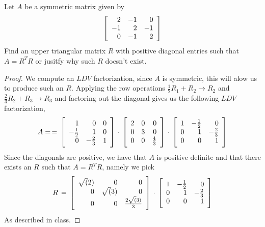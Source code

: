\newpage 
\question 
Let $A$ be a symmetric matrix given by 
\begin{equation}
    \mat{rrr}
    2 & -1 & 0 \\ 
    -1 & 2 & -1 \\ 
    0 & -1 & 2
    \rix
\end{equation}
Find an upper triangular matrix $R$ with positive diagonal entries such that $A = R^TR$ or jusitfy why such $R$ doesn't exist. 

\begin{proof}
    We compute an $LDV$ factorization, since $A$ is symmetric, this will alow us to produce such an $R$. Applying the row operations 
    $\frac{1}{2}R_1 + R_2 \to R_2$ and $\frac{2}{3}R_2 + R_3 \to R_3$ and factoring out the diagonal gives us the following $LDV$ factorization, 
    \begin{equation}
        A = \, = \, 
        \mat{rrr}
        1 & 0 & 0 \\ 
        -\frac{1}{2} & 1 & 0 \\
        0 & -\frac{2}{3} & 1 
        \rix 
        \, \cdot \, 
        \mat{rrr}
        2 & 0 & 0 \\ 
        0 & 3 & 0 \\
        0 & 0 & \frac{4}{3}
        \rix 
        \, \cdot \, 
        \mat{rrr}
        1 & -\frac{1}{2} & 0 \\ 
        0 & 1 & -\frac{2}{3} \\ 
        0 & 0 & 1 
        \rix
    \end{equation}
    Since the diagonals are positive, we have that $A$ is positive definite and that there exists an $R$ such that $A = R^TR$, namely we pick 
    \begin{equation}
        R \, = \, 
        \mat{rrr}
        \sqrt(2) & 0 & 0 \\ 
        0 & \sqrt(3) & 0 \\
        0 & 0 & \frac{2 \sqrt(3)}{3}
        \rix
        \, \cdot \, 
        \mat{rrr}
        1 & -\frac{1}{2} & 0 \\ 
        0 & 1 & -\frac{2}{3} \\ 
        0 & 0 & 1 
        \rix
    \end{equation}
    As described in class. 
\end{proof}
